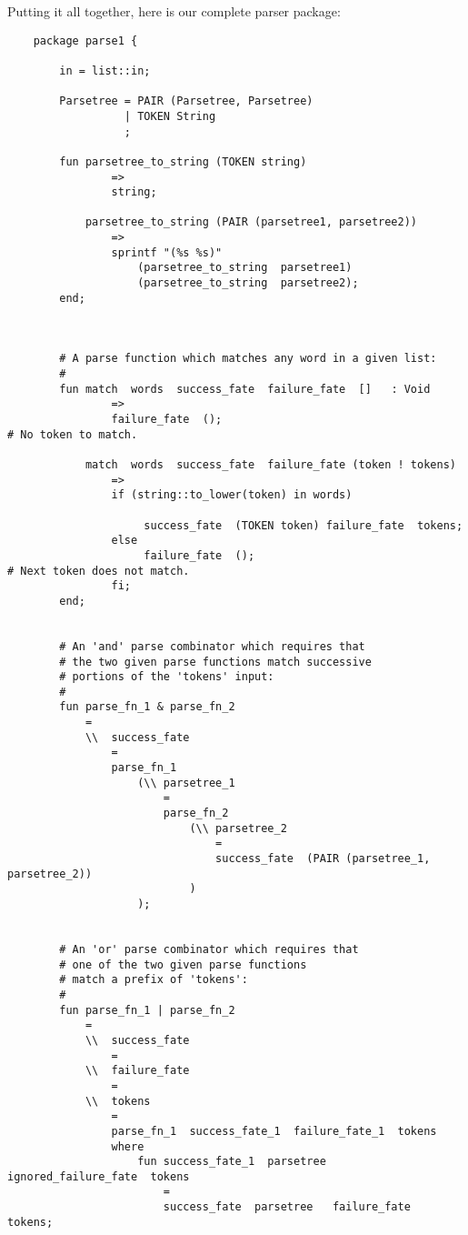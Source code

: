 Putting it all together, here is our complete parser package:

\begin{verbatim}
    package parse1 {

        in = list::in;

        Parsetree = PAIR (Parsetree, Parsetree)
                  | TOKEN String
                  ;

        fun parsetree_to_string (TOKEN string)
                =>
                string;

            parsetree_to_string (PAIR (parsetree1, parsetree2))
                =>
                sprintf "(%s %s)"
                    (parsetree_to_string  parsetree1)
                    (parsetree_to_string  parsetree2);
        end;



        # A parse function which matches any word in a given list:
        #
        fun match  words  success_fate  failure_fate  []   : Void
                =>
                failure_fate  ();                                               # No token to match.

            match  words  success_fate  failure_fate (token ! tokens)
                =>
                if (string::to_lower(token) in words)

                     success_fate  (TOKEN token) failure_fate  tokens;
                else
                     failure_fate  ();                                          # Next token does not match.
                fi;         
        end;


        # An 'and' parse combinator which requires that
        # the two given parse functions match successive
        # portions of the 'tokens' input:
        #
        fun parse_fn_1 & parse_fn_2
            =
            \\  success_fate
                =
                parse_fn_1
                    (\\ parsetree_1
                        =
                        parse_fn_2
                            (\\ parsetree_2
                                =
                                success_fate  (PAIR (parsetree_1, parsetree_2))
                            )
                    );


        # An 'or' parse combinator which requires that
        # one of the two given parse functions
        # match a prefix of 'tokens':
        #
        fun parse_fn_1 | parse_fn_2
            =
            \\  success_fate
                =
            \\  failure_fate
                =
            \\  tokens
                =
                parse_fn_1  success_fate_1  failure_fate_1  tokens
                where
                    fun success_fate_1  parsetree   ignored_failure_fate  tokens
                        =
                        success_fate  parsetree   failure_fate  tokens;


\end{verbatim}
